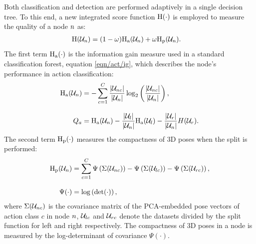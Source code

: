 Both classification and detection are performed adaptively in a single decision tree. To this end, a new integrated score function $\mathrm{H}(\cdot)$ is employed to measure the quality of a node $n$ as:
\begin{align}
	\label{eqn/body/newquality}
	\mathrm{H}(\mathcal{U}_{n}) & = (1 - \omega)\mathrm{H_{a}}(\mathcal{U}_{n}) + \omega\mathrm{H_{p}}(\mathcal{U}_{n}).
\end{align}
The first term $\mathrm{H_{a}}(\cdot)$ is the information gain measure used in a standard classification forest, \cf equation \ref{eqn/act/ig}, which describes the node's performance in action classification: 
\begin{equation}
	\label{eqn/body/infogain}
	\begin{aligned}
		\mathrm{H_{a}}(\mathcal{U}_{n}) & = 
		- \displaystyle\sum_{c = 1}^{C} \frac{|\mathcal{U}_{n c}|}{|\mathcal{U}_{n}|}\log_{2}\left(\frac{|\mathcal{U}_{n c}|}{|\mathcal{U}_{n}|}\right), \\[3mm]
		Q_{a} & = 
		\mathrm{H_{a}}(\mathcal{U}_{n}) - 
		\frac{|\mathcal{U}_{l}|}{|\mathcal{U}_{n}|} \mathrm{H_{a}}(\mathcal{U}_{l}) -  
		\frac{|\mathcal{U}_{r}|}{|\mathcal{U}_{n}|} H(\mathcal{U}_{r}). 
	\end{aligned}
\end{equation}
The second term $\mathrm{H_{p}}(\cdot)$ measures the compactness of 3D poses when the split is performed:
\begin{align}
	\mathrm{H_{p}}(\mathcal{U}_{n}) & = \displaystyle\sum_{c = 1}^{C} \Psi\left(\Sigma(\mathcal{U}_{n c})\right) - \Psi\left(\Sigma(\mathcal{U}_{lc})\right) 
	- \Psi\left(\Sigma(\mathcal{U}_{rc})\right), \\[3mm]
	\Psi(\cdot) & = \log\left(\det(\cdot)\right),
\end{align} 
where $\Sigma(\mathcal{U}_{n c})$ is the covariance matrix of the PCA-embedded pose vectors of action class $c$ in node $n$, $\mathcal{U}_{lc}$ and $\mathcal{U}_{rc}$ denote the datasets divided by the split function for left and right respectively. The compactness of 3D poses in a node is measured by the log-determinant of covariance $\Psi(\cdot)$. 

